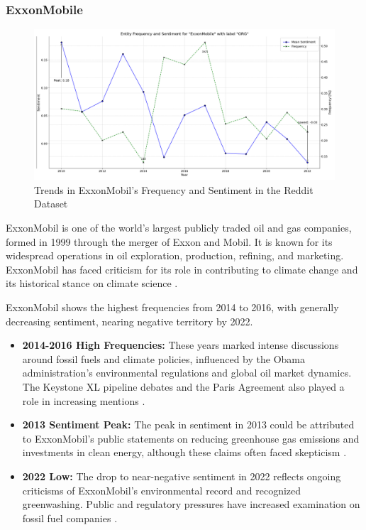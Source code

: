 \subsubsection{ExxonMobile}
\begin{figure}[h]
    \includegraphics[width=\textwidth]{images/topic_details/entities/entity_frequency_ExxonMobile.png}
    \caption{Trends in ExxonMobil's Frequency and Sentiment in the Reddit Dataset}
    \label{fig:entity_exxonmobile}
\end{figure}

ExxonMobil is one of the world's largest publicly traded oil and gas companies, formed in 1999 through the merger of Exxon and Mobil. It is known for its widespread operations in oil exploration, production, refining, and marketing. ExxonMobil has faced criticism for its role in contributing to climate change and its historical stance on climate science \cite{worldbank2024,britannica2024exxon}.

ExxonMobil shows the highest frequencies from 2014 to 2016, with generally decreasing sentiment, nearing negative territory by 2022.

\begin{itemize}
    \item \textbf{2014-2016 High Frequencies:} These years marked intense discussions around fossil fuels and climate policies, influenced by the Obama administration's environmental regulations and global oil market dynamics. The Keystone XL pipeline debates and the Paris Agreement also played a role in increasing mentions \cite{worldbank2024,climatechangenews2015}.
    \item \textbf{2013 Sentiment Peak:} The peak in sentiment in 2013 could be attributed to ExxonMobil's public statements on reducing greenhouse gas emissions and investments in clean energy, although these claims often faced skepticism \cite{spiegel2017}.
    \item \textbf{2022 Low:} The drop to near-negative sentiment in 2022 reflects ongoing criticisms of ExxonMobil's environmental record and recognized greenwashing. Public and regulatory pressures have increased examination on fossil fuel companies \cite{plosone2024}.
\end{itemize}

